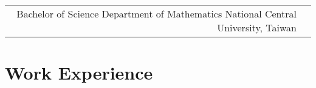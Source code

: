 \documentclass[10pt]{article} %
\begin{document}
\begin{paracol}{2}
\begin{supertabular}{rl}

    {Bachelor of Science} %
    {} %
    {Department of Mathematics} %
    {National Central University, Taiwan} %


  \end{supertabular}


  \section{Work Experience}






\end{paracol}
\end{document}
